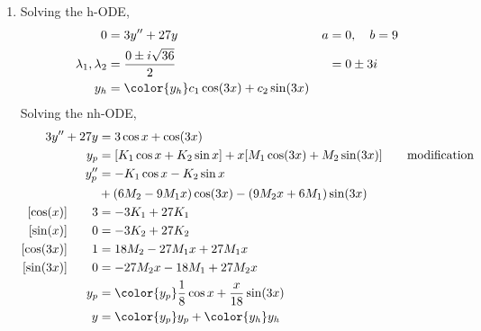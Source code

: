 \begin{enumerate}
    \item Solving the h-ODE,
          \begin{align}
              0                        & = 3y'' + 27y                                & a & = 0, \quad b = 9 \\
              \lambda_{1}, \lambda_{2} & = \frac{0 \pm i\sqrt{36}}{2}                &   & = 0 \pm 3i       \\
              y_{h}                    & = \color{y_h} c_{1}\cos(3x) + c_{2}\sin(3x)
          \end{align}
          Solving the nh-ODE,
          \begin{align}
              3y'' + 27y          & = 3\cos x + \cos(3x)                                                                                  \\
              y_{p}               & = [K_{1} \cos x + K_{2} \sin x] + x[M_{1}\cos(3x) + M_{2}\sin(3x)]         \qquad \text{modification} \\
              y_{p}''             & = -K_{1}\cos x - K_{2}\sin x                                                                          \\
                                  & +  (6M_{2} - 9M_{1}x)\cos(3x) - (9M_{2}x + 6M_{1})\sin(3x)                                            \\
              [\cos(x)] \qquad 3  & =  -3K_{1} + 27K_{1}                                                                                  \\
              [\sin(x)] \qquad 0  & =  -3K_{2} + 27K_{2}                                                                                  \\
              [\cos(3x)] \qquad 1 & =  18M_{2} - 27M_{1}x + 27M_{1}x                                                                      \\
              [\sin(3x)] \qquad 0 & =  -27M_{2}x - 18M_{1} + 27M_{2}x                                                                     \\
              y_{p}               & = \color{y_p} \frac{1}{8} \cos x + \frac{x}{18}\sin(3x)                                               \\
              y                   & = {\color{y_p} y_{p}} + {\color{y_h} y_{h}}
          \end{align}


\end{enumerate}
